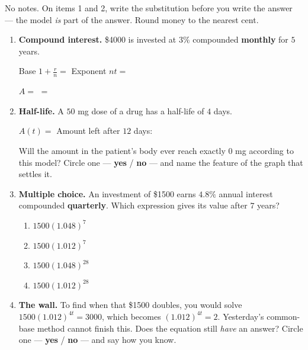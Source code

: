 \documentclass[10pt]{article}
\begin{document}
\namedateperiod

\vspace{0.08in}

No notes. On items 1 and 2, write the substitution before you write the answer --- the model \emph{is}
part of the answer. Round money to the nearest cent.

\begin{enumerate}[leftmargin=1.8em, itemsep=11pt]
  \item \textbf{Compound interest.} \$4000 is invested at $3\%$ compounded \textbf{monthly} for
        $5$ years.

        \vspace{4pt}
        Base $1+\frac{r}{n}=$ \blank{2.6cm} \qquad Exponent $nt=$ \blank{1.8cm}

        \vspace{5pt}
        $A=$ \blank{5.0cm} $=$ \blank{2.4cm}

  \item \textbf{Half-life.} A $50$ mg dose of a drug has a half-life of $4$ days.

        \vspace{4pt}
        $A(t)=$ \blank{4.2cm} \hfill Amount left after $12$ days: \blank{2.2cm}

        \vspace{5pt}
        Will the amount in the patient's body ever reach exactly $0$ mg according to this model?
        Circle one --- \textbf{yes} \; / \; \textbf{no} --- and name the feature of the graph that
        settles it. \writeline

  \item \textbf{Multiple choice.} An investment of \$1500 earns $4.8\%$ annual interest compounded
        \textbf{quarterly}. Which expression gives its value after $7$ years?
        \begin{enumerate}[label=\Alph*., leftmargin=1.9em, itemsep=1pt]
          \item $1500(1.048)^{7}$
          \item $1500(1.012)^{7}$
          \item $1500(1.048)^{28}$
          \item $1500(1.012)^{28}$
        \end{enumerate}

  \item \textbf{The wall.} To find when that \$1500 doubles, you would solve
        $1500(1.012)^{4t}=3000$, which becomes $(1.012)^{4t}=2$. Yesterday's common-base method cannot
        finish this. Does the equation still \emph{have} an answer? Circle one --- \textbf{yes} \; /
        \; \textbf{no} --- and say how you know. \writeline
\end{enumerate}
\end{document}
